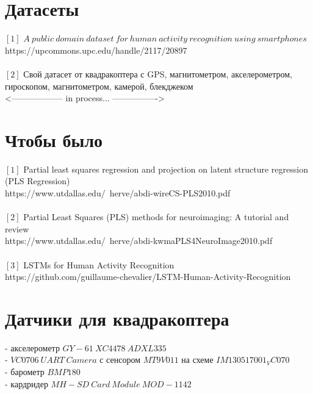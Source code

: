 \documentclass[12pt,twoside]{article}
\begin{document}
\section{Датасеты}
$[1]$ $A\ public\ domain\ dataset\ for\ human\ activity\ recognition\ using\ smartphones$ \\https://upcommons.upc.edu/handle/2117/20897\\
\\$[2]$ Свой датасет от квадракоптера с GPS, магнитометром, акселерометром, гироскопом, магнитометром, камерой, блекджеком \\<------------------ in process... ---------------->

\section{Чтобы было}
$[1]$ Partial least squares regression
and projection on latent structure
regression (PLS Regression)\\https://www.utdallas.edu/~herve/abdi-wireCS-PLS2010.pdf\\
\\$[2]$ Partial Least Squares (PLS) methods for neuroimaging: A tutorial and review \\https://www.utdallas.edu/~herve/abdi-kwmaPLS4NeuroImage2010.pdf\\
\\$[3]$ LSTMs for Human Activity Recognition\\https://github.com/guillaume-chevalier/LSTM-Human-Activity-Recognition\\
\section{Датчики для квадракоптера}
- акселерометр $GY-61\ XC4478\ ADXL335$\\
- $VC0706\ UART\ Camera$ с сенсором $MT9V011$ на схеме $IM130517001_VC070$\\
- барометр $BMP180$\\
- кардридер $MH-SD\ Card\ Module\ MOD-1142$ 
\end{document}
